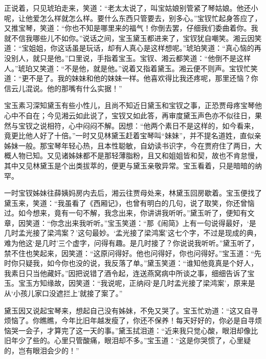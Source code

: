 \documentclass[12pt,oneside]{book}
\begin{document}
正说着，只见琥珀走来，笑道：“老太太说了，叫宝姑娘别管紧了琴姑娘。他还小呢，让他爱怎么样就怎么样。要什么东西只管要去，别多心。”宝钗忙起身答应了，又推宝琴，笑道：“你也不知是哪里来的福气！你倒去罢，仔细我们委曲着你。我就不信我哪些儿不如你。”说话之间，宝玉黛玉都进来了，宝钗犹自嘲笑。湘云因笑道：“宝姐姐，你这话虽是玩话，却有人真心是这样想呢。”琥珀笑道：“真心恼的再没别人，就只是他。”口里说，手指着宝玉。宝钗、湘云都笑道：“他倒不是这样人。”琥珀又笑道：“不是他，就是他。”说着又指着黛玉。湘云便不则声。宝钗忙笑道：“更不是了。我的妹妹和他的妹妹一样。他喜欢得比我还疼呢，那里还恼？你信云儿混说。他的那嘴有什么实据！”

宝玉素习深知黛玉有些小性儿，且尚不知近日黛玉和宝钗之事，正恐贾母疼宝琴他心中不自在；今见湘云如此说了，宝钗又如此答，再审度黛玉声色亦不似往日，果然与宝钗之说相符，心中闷闷不解。因想：“他两个素日不是这样的，如今看来，竟更比他人好了十倍。”一时又见林黛玉赶着宝琴叫“妹妹”，并不提名道姓，直似亲姊妹一般。那宝琴年轻心热，且本性聪敏，自幼读书识字，今在贾府住了两日，大概人物已知。又见诸姊妹都不是那轻薄脂粉，且又和姐姐皆和契，故也不肯怠慢，其中又见林黛玉是个出类拔萃的，便更与黛玉亲敬异常。宝玉看着，只是暗暗的纳罕。

一时宝钗姊妹往薛姨妈房内去后，湘云往贾母处来，林黛玉回房歇着。宝玉便找了黛玉来，笑道：“我虽看了《西厢记》，也曾有明白的几句，说了取笑，你还曾恼过。如今想来，竟有一句不解，我念出来，你讲讲我听听。”黛玉听了，便知有文章，因笑道：“你念出来我听听。”宝玉笑道：“那《闹简》上有一句说得最好，‘是几时孟光接了梁鸿案？’这句最妙。‘孟光接了梁鸿案’这七个字，不过是现成的典，难为他这‘是几时’三个虚字，问得有趣。是几时接了？你说说我听听。”黛玉听了，禁不住也笑起来，因笑道：“这原问得好。他也问得好，你也问得好。”宝玉道：“先时你只疑我，如今你也没的说，我反落了单。”黛玉笑道：“谁知他竟真是个好人，我素日只当他藏奸。”因把说错了酒令起，连送燕窝病中所谈之事，细细告诉了宝玉。宝玉方知缘故，因笑道：“我说呢，正纳闷‘是几时孟光接了梁鸿案’，原来是从‘小孩儿家口没遮拦上’就接了案了。”

黛玉因又说起宝琴来，想起自己没有姊妹，不免又哭了。宝玉忙劝道：“这又自寻烦恼了。你瞧瞧，今年比旧年越发瘦了，你还不保养！每天好好的，你必是自寻烦恼哭一会子，才算完了这一天的事。”黛玉拭泪道：“近来我只觉心酸，眼泪却像比旧年少了些的。心里只管酸痛，眼泪却不多。”宝玉道：“这是你哭惯了，心里疑的，岂有眼泪会少的！”
\end{document}
